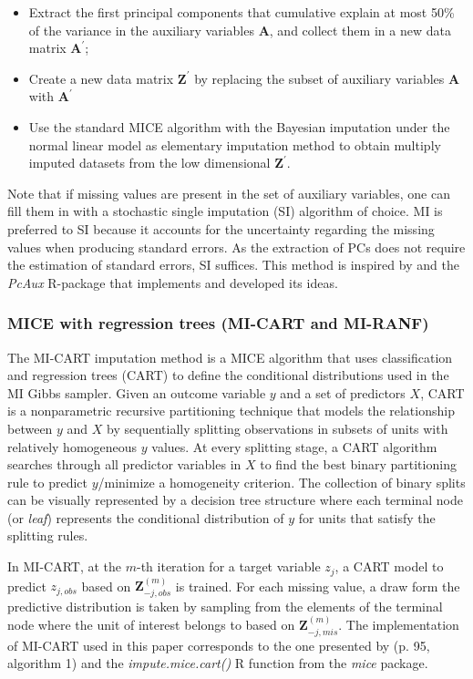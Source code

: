 	\begin{itemize}

	\item Extract the first principal components that cumulative explain at most 50\% of the variance 
		in the auxiliary variables $\bm{A}$, and collect them in a new data matrix $\bm{A}^{'}$;
	\item Create a new data matrix $\bm{Z}^{'}$ by replacing the subset of auxiliary variables $\bm{A}$ 
		with $\bm{A}^{'}$
	\item Use the standard MICE algorithm with the Bayesian imputation under the normal linear model 
		\citep[p. 68, algorithm 3.1]{vanBuuren:2012} as elementary imputation method to obtain multiply 
		imputed datasets from the low dimensional $\bm{Z}^{'}$.
	\end{itemize}

	Note that if missing values are present in the set of auxiliary variables, one can fill them in with a 
	stochastic single imputation (SI) algorithm of choice.
	MI is preferred to SI because it accounts for the uncertainty regarding the missing values when producing 
	standard errors.
	As the extraction of PCs does not require the estimation of standard errors, SI suffices.
	This method is inspired by \cite{howardEtAl:2015} and the \emph{PcAux} R-package \citep{PcAux} that 
	implements and developed its ideas.
	
\subsubsection{MICE with regression trees (MI-CART and MI-RANF)}
	The MI-CART imputation method \citep{burgetteReiter:2010} is a MICE algorithm that uses classification and regression 
	trees (CART) to define the conditional distributions used in the MI Gibbs sampler.
	Given an outcome variable $y$ and a set of predictors $X$, CART is a nonparametric recursive partitioning technique 
	that models the relationship between $y$ and $X$ by sequentially splitting observations in subsets of units with 
	relatively homogeneous $y$ values.
	At every splitting stage, a CART algorithm searches through all predictor variables in $X$ to find the best binary 
	partitioning rule to predict $y$/minimize a homogeneity criterion.
	The collection of binary splits can be visually represented by a decision tree structure where each terminal 
	node (or \emph{leaf}) represents the conditional distribution of $y$ for units that satisfy the splitting rules.

	In MI-CART, at the $m$-th iteration for a target variable $z_j$, a CART model to predict $z_{j, obs}$ based on 
	$\bm{Z}_{-j, obs}^{(m)}$ is trained.
	For each missing value, a draw form the predictive distribution is taken by sampling from the elements of the terminal 
	node where the unit of interest belongs to based on $\bm{Z}_{-j, mis}^{(m)}$.
	The implementation of MI-CART used in this paper corresponds to the one presented by \cite{dooveEtAl:2014}
	(p. 95, algorithm 1) and the \emph{impute.mice.cart()} R function from the \emph{mice} package.

